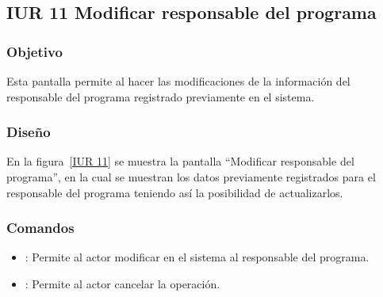 \subsection{IUR 11 Modificar responsable del programa}

\subsubsection{Objetivo}

	
	Esta pantalla permite al  hacer las modificaciones de la información del responsable del programa registrado previamente en el sistema.
	
\subsubsection{Diseño}


	En la figura~\ref{IUR 11} se muestra la pantalla ``Modificar responsable del programa'', en la cual se muestran los datos previamente registrados para el responsable del programa teniendo así la posibilidad de actualizarlos. 



\subsubsection{Comandos}
\begin{itemize}
	\item {}: Permite al actor modificar en el sistema al responsable del programa. 
	\item {}: Permite al actor cancelar la operación.
\end{itemize}

